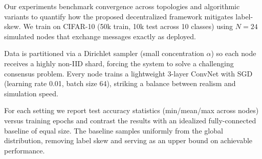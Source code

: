 Our experiments benchmark convergence across topologies and algorithmic variants to quantify how the proposed decentralized framework mitigates label-skew. We train on CIFAR-10 (50k train, 10k test across 10 classes) using $N=24$ simulated nodes that exchange messages exactly as deployed.

Data is partitioned via a Dirichlet sampler (small concentration $\alpha$) so each node receives a highly non-IID shard, forcing the system to solve a challenging consensus problem. Every node trains a lightweight 3-layer ConvNet with SGD (learning rate 0.01, batch size 64), striking a balance between realism and simulation speed.

For each setting we report test accuracy statistics (min/mean/max across nodes) versus training epochs and contrast the results with an idealized fully-connected baseline of equal size. The baseline samples uniformly from the global distribution, removing label skew and serving as an upper bound on achievable performance.
